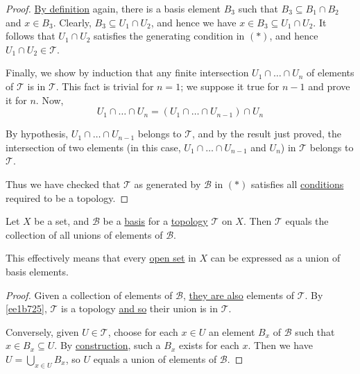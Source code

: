 \begin{proof}
  \href{e896402}{By definition} again, there is a basis element $B_3$ such that
  $B_3\subseteq B_1\cap B_2$ and $x\in B_3$. Clearly, $B_3\subseteq U_1\cap
  U_2$, and hence we have $x\in B_3\subseteq U_1\cap U_2$. It follows that
  $U_1\cap U_2$ satisfies the generating condition in $(*)$, and hence $U_1\cap
  U_2\in\mathcal T$.

  Finally, we show by induction that any finite intersection $U_1\cap\ldots\cap
  U_n$ of elements of $\mathcal T$ is in $\mathcal T$. This fact is trivial for
  $n=1$; we suppose it true for $n-1$ and prove it for $n$. Now,
  $$
    U_1\cap\ldots\cap U_n=(U_1\cap\ldots\cap U_{n-1})\cap U_n
  $$

  By hypothesis, $U_1\cap\ldots\cap U_{n-1}$ belongs to $\mathcal T$, and by
  the result just proved, the intersection of two elements (in this case,
  $U_1\cap\ldots\cap U_{n-1}$ and $U_n$) in $\mathcal T$ belongs to $\mathcal
  T$.

  Thus we have checked that $\mathcal T$ as generated by $\mathcal B$ in $(*)$
  satisfies all \href{cc8eb8b}{conditions} required to be a topology.
\end{proof}

\label{cd21899}

Let $X$ be a set, and $\mathcal B$ be a \href{e896402}{basis} for a
\href{cc8eb8b}{topology} $\mathcal T$ on $X$. Then $\mathcal T$ equals the
collection of all unions of elements of $\mathcal B$.

This effectively means that every \href{c4490f8}{open set} in $X$ can be
expressed as a union of basis elements.

\begin{proof}
  Given a collection of elements of $\mathcal B$, \href{e6b5306}{they are also}
  elements of $\mathcal T$. By \autoref{ee1b725}, $\mathcal T$ is a topology
  \href{cc8eb8b}{and so} their union is in $\mathcal T$.

  Conversely, given $U\in\mathcal T$, choose for each $x\in U$ an element $B_x$
  of $\mathcal B$ such that $x\in B_x\subseteq U$. By
  \href{e6b5306}{construction}, such a $B_x$ exists for each $x$. Then we have
  $U=\bigcup_{x\in U}B_x$, so $U$ equals a union of elements of $\mathcal B$.
\end{proof}

\label{bc13024}

